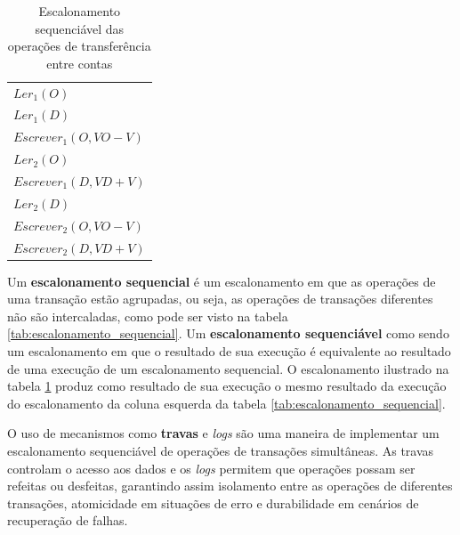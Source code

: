 \documentclass[11pt,twoside,a4paper]{book}
\begin{document}
\begin{table}
\caption{Escalonamento sequenciável das operações de transferência entre contas}
\label{tab:escalonamento_sequenciavel}
\centering
\begin{tabular}{ | l | }
	\hline
	$Ler_1(O)$\\
	$Ler_1(D)$\\
	$Escrever_1(O, VO - V)$\\
	$Ler_2(O)$\\
	$Escrever_1(D, VD + V)$\\
	$Ler_2(D)$\\
	$Escrever_2(O, VO - V)$\\
	$Escrever_2(D, VD + V)$\\
	\hline
\end{tabular}
\end{table}

Um \textbf{escalonamento sequencial} é um escalonamento em que as operações de uma transação estão agrupadas, ou seja, as operações de transações diferentes não são intercaladas, como pode ser visto na tabela \ref{tab:escalonamento_sequencial}. Um \textbf{escalonamento sequenciável} como sendo um escalonamento em que o resultado de sua execução é equivalente ao resultado de uma execução de um escalonamento sequencial. O escalonamento ilustrado na tabela \ref{tab:escalonamento_sequenciavel} produz como resultado de sua execução o mesmo resultado da execução do escalonamento da coluna esquerda da tabela \ref{tab:escalonamento_sequencial}.

O uso de mecanismos como \textbf{travas} e \emph{logs} são uma maneira de implementar um escalonamento sequenciável de operações de transações simultâneas. As travas controlam o acesso aos dados e os \emph{logs} permitem que operações possam ser refeitas ou desfeitas, garantindo assim isolamento entre as operações de diferentes transações, atomicidade em situações de erro e durabilidade em cenários de recuperação de falhas.


\end{document}
